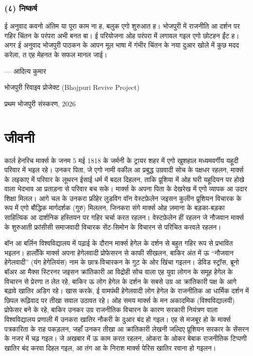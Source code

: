 \documentclass[12pt,a4paper,oneside]{book}
\begin{document}
\subsection*{(८) निष्कर्ष}
ई अनुवाद कवनो अंतिम या पूरा काम ना ह, बलुक एगो शुरुआत ह। भोजपुरी में राजनीति आ दर्शन पर गहिर चिंतन के परंपरा अभी बनत बा। ई परियोजना ओह परंपरा में लगावल गइल एगो छोटहन ईंट ह। अगर ई अनुवाद भोजपुरी पाठकन के आपन मूल भाषा में गंभीर चिंतन के नया दुआर खोले में कुछ मदद करेला, त एह मेहनत के सफल मानल जाई।

— आदित्य कुमार

भोजपुरी रिवाइव प्रोजेक्ट {\engfont (Bhojpuri Revive Project)}

प्रथम भोजपुरी संस्करण, 2026

\cleardoublepage
\chapter*{जीवनी}
कार्ल हेनरिच मार्क्स के जनम 5 मई 1818 के जर्मनी के ट्रायर शहर में एगो खुशहाल मध्यमवर्गीय यहूदी परिवार में भइल रहे। उनकर पिता, जे एगो नामी वकील आ प्रबुद्ध उग्रवादी सोच के पक्षधर रहलन, मार्क्स के लइकाए में परिवार के लूथरन ईसाई धर्म में बदल दिहलन, ताकि प्रूशिया में ओह घरी यहूदियन पर होखे वाला भेदभाव आ प्रताड़ना से परिवार बच सके। मार्क्स के अपना पिता के देखरेख में एगो व्यापक आ उदार शिक्षा मिलल। आगे चल के उनकरा फ्रीहेर लुडविग वॉन वेस्टफ़ेलेन जइसन कुलीन प्रूशियन विचारक के रूप में एगो बौद्धिक मार्गदर्शक (गुरु) मिललन, जिनकरा संगे मार्क्स ओह ज़माना के बड़का-बड़का साहित्यिक आ दार्शनिक हस्तियन पर गहिर चर्चा करत रहलन। वेस्टफ़ेलेन हीं रहलन जे नौजवान मार्क्स के शुरुआती फ्रांसीसी समाजवादी विचारक सेंट-सिमोन के विचारन से परिचित करवले रहलन।

बॉन आ बर्लिन विश्वविद्यालय में पढ़ाई के दौरान मार्क्स हेगेल के दर्शन से बहुत गहिर रूप से प्रभावित भइलन। हालाँकि मार्क्स अपना हेगेलवादी प्रोफेसरन से काफी सीखलन, बाकिर अंत में ऊ “नौजवान हेगेलवादी” (यंग हेगेलियंस) नाम के छात्र-विचारकन के गुट के ओर खिंचा गइलन। डेविड स्ट्रॉस, ब्रूनो बॉअर आ मैक्स स्टिरनर जइसन क्रांतिकारी आ विद्रोही सोच वाला एह युवा लोगन के समूह हेगेल के विचारन से प्रेरणा त लेत रहे, बाकिर ऊ लोग हेगेल के दर्शन के सबसे उग्र आ क्रांतिकारी पक्ष के आगे बढ़ावे खातिर अडिग रहे। खास करके, ई वामपंथी हेगेलवादी लोग हेगेल के राजनीतिक आ धार्मिक दर्शन में छिपल रूढ़िवाद पर तीखा सवाल उठावत रहे। ओह समय मार्क्स के मन अकादमिक (विश्वविद्यालयी) प्रोफेसर बने के रहे, बाकिर उनकर उग्र राजनीतिक विचारन के कारण सरकारी नियंत्रण वाला विश्वविद्यालय प्रणाली में उनकरा खातिर नौकरी के दुआर बंद हो गइल। एह से मजबूर हो के मार्क्स पत्रकारिता के राह पकड़लन, जहाँ उनकर तीखा आ क्रांतिकारी लेखनी जल्दिए प्रूशियन सरकार के सेंसरन के नजर में चढ़ गइल। जे अखबार में ऊ काम करत रहलन, ओकरा के ओकर बेबाक राजनीतिक टिप्पणी खातिर बंद करवा दिहल गइल, आ तंग आ के निराश मार्क्स पेरिस खातिर रवाना हो गइलन।
\end{document}
